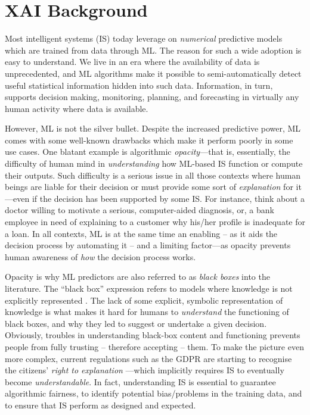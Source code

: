 \documentclass[12pt,a4paper,openright,twoside]{book}
\begin{document}
\section{XAI Background}\label{sec:background}

Most intelligent systems (IS) today leverage on \emph{numerical} predictive models which are trained from data through ML.
%
The reason for such a wide adoption is easy to understand.
%
We live in an era where the availability of data is unprecedented, and ML algorithms make it possible to semi-automatically detect useful statistical information hidden into such data.
%
Information, in turn, supports decision making, monitoring, planning, and forecasting in virtually any human activity where data is available.

However, ML is not the silver bullet.
%
Despite the increased predictive power, ML comes with some well-known drawbacks which make it perform poorly in some use cases.
%
One blatant example is algorithmic \emph{opacity}---that is, essentially, the difficulty of human mind in \emph{understanding} how ML-based IS function or compute their outputs.
%
Such difficulty is a serious issue in all those contexts where human beings are liable for their decision or must provide some sort of \emph{explanation} for it---even if the decision has been supported by some IS.
%
For instance, think about a doctor willing to motivate a serious, computer-aided diagnosis, or, a bank employee in need of explaining to a customer why his/her profile is inadequate for a loan.
%
In all contexts, ML is at the same time an enabling -- as it aids the decision process by automating it -- and a limiting factor---as opacity prevents human awareness of \emph{how} the decision process works.

Opacity is why ML predictors are also referred to as \emph{black boxes} into the literature.
%
The ``black box'' expression refers to models where knowledge is not explicitly represented \cite{Lipton18}. 
%
The lack of some explicit, symbolic representation of knowledge is what makes it hard for humans to \emph{understand} the functioning of black boxes, and why they led to suggest or undertake a given decision.
%
Obviously, troubles in understanding black-box content and functioning prevents people from fully trusting -- therefore accepting -- them. 
%
To make the picture even more complex, current regulations such as the GDPR \cite{gdpr-voigt2017} are starting to recognise the citizens' \emph{right to explanation} \cite{explanation-aimag38}---which implicitly requires IS to eventually become \emph{understandable}.
%
In fact, understanding IS is essential to guarantee algorithmic fairness, to identify potential bias/problems in the training data, and to ensure that IS perform as designed and expected. 
\end{document}
